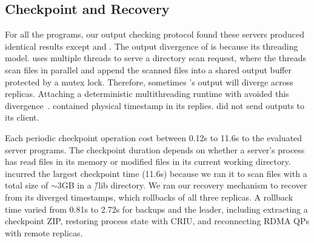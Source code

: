




\subsection{Checkpoint and Recovery} \label{sec:robust}

For all the \nprog programs, our output checking protocol found these servers 
produced identical results except \clamav and \mediatomb. The output divergence 
of \clamav is because its threading model. \clamav uses multiple threads to 
serve a directory scan request, where the threads scan files in parallel and 
append the scanned files into a shared output buffer protected by a mutex lock. 
Therefore, sometimes \clamav's output will diverge across replicas. Attaching a 
deterministic multithreading runtime with \clamav avoided this 
divergence~\cite{crane:sosp15}. \mediatomb contained physical timestamp in its 
replies. \calvin did not send outputs to its client.


Each \xxx periodic checkpoint operation cost between 0.12s to 11.6s to the 
evaluated server programs. The checkpoint duration depends on whether a 
server's process has read files in its memory or modified files in its current 
working directory. \clamav incurred the largest checkpoint time (11.6s) because 
we ran it to scan files with a total size of $\sim$3GB in a \v{/lib} directory. 
We ran our recovery mechanism to recover \clamav from its diverged 
timestamps, which rollbacks of all three replicas. A \clamav rollback time 
varied from 0.81s to 2.72s for backups and the leader, including extracting a 
checkpoint ZIP, restoring process state with CRIU, and reconnecting RDMA QPs 
with remote replicas.








